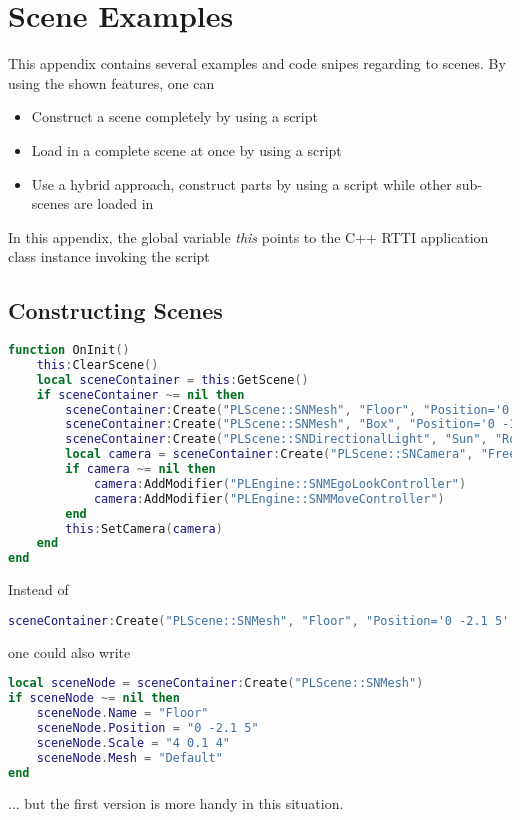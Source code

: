 \chapter{Scene Examples}
\label{Appendix:SceneExamples}
This appendix contains several examples and code snipes regarding to scenes. By using the shown features, one can
\begin{itemize}
\item{Construct a scene completely by using a script}
\item{Load in a complete scene at once by using a script}
\item{Use a hybrid approach, construct parts by using a script while other sub-scenes are loaded in}
\end{itemize}
In this appendix, the global variable \emph{this} points to the C++ \ac{RTTI} application class instance invoking the script 




\section{Constructing Scenes}
\begin{lstlisting}[language=lua]
function OnInit()
	this:ClearScene()
	local sceneContainer = this:GetScene()
	if sceneContainer ~= nil then
		sceneContainer:Create("PLScene::SNMesh", "Floor", "Position='0 -2.1 5' Scale='4 0.1 4' Rotation='0 180 0' Mesh='Default'")
		sceneContainer:Create("PLScene::SNMesh", "Box", "Position='0 -1.5 5' Scale='0.5 0.5 0.5' Mesh='Default'")
		sceneContainer:Create("PLScene::SNDirectionalLight", "Sun", "Rotation='45 0 0'")
		local camera = sceneContainer:Create("PLScene::SNCamera", "FreeCamera")
		if camera ~= nil then
			camera:AddModifier("PLEngine::SNMEgoLookController")
			camera:AddModifier("PLEngine::SNMMoveController")
		end
		this:SetCamera(camera)
	end
end
\end{lstlisting}

Instead of
\begin{lstlisting}[language=lua]
sceneContainer:Create("PLScene::SNMesh", "Floor", "Position='0 -2.1 5' Scale='4 0.1 4' Rotation='0 180 0' Mesh='Default'")
\end{lstlisting}
one could also write
\begin{lstlisting}[language=lua]
local sceneNode = sceneContainer:Create("PLScene::SNMesh")
if sceneNode ~= nil then
	sceneNode.Name = "Floor"
	sceneNode.Position = "0 -2.1 5"
	sceneNode.Scale = "4 0.1 4"
	sceneNode.Mesh = "Default"
end
\end{lstlisting}
... but the first version is more handy in this situation.

